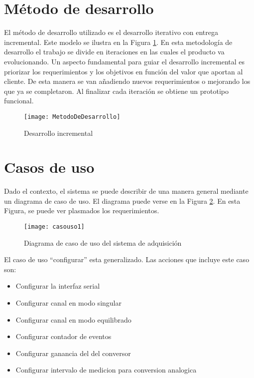 \section{Método de desarrollo} %
\label{sec:metodo_de_desarrollo}

El método de desarrollo utilizado es el desarrollo iterativo con entrega incremental. Este modelo se ilustra en la Figura \ref{fig:MetodoDeDesarrollo}. En esta metodología de desarrollo el trabajo se divide en iteraciones en las cuales el producto va evolucionando. 
Un aspecto fundamental para guiar el desarrollo incremental es priorizar los requerimientos y los objetivos en función del valor que aportan al cliente. De esta manera se van añadiendo nuevos requerimientos o mejorando los que ya se completaron. Al finalizar cada iteración se obtiene un prototipo funcional.

\begin{figure}[h]
  \centering
  \texttt{[image: MetodoDeDesarrollo]}
  \caption{Desarrollo incremental}\label{fig:MetodoDeDesarrollo}
\end{figure}


\section{Casos de uso} %
\label{sec:casos_de_uso}

Dado el contexto, el sistema se puede describir de una manera general mediante un diagrama de caso de uso. El diagrama puede verse en la Figura \ref{fig:casouso1}. En esta Figura, se puede ver plasmados los requerimientos.

\begin{figure}[h]
  \centering
  \texttt{[image: casouso1]}
  \caption{Diagrama de caso de uso del sistema de adquisición}\label{fig:casouso1}
\end{figure}

El caso de uso ``configurar'' esta generalizado. Las acciones que incluye este caso son:
\begin{itemize}
	\item Configurar la interfaz serial
	\item Configurar canal en modo singular
	\item Configurar canal en modo equilibrado
	\item Configurar contador de eventos
	\item Configurar ganancia del del conversor
	\item Configurar intervalo de medicion para conversion analogica
\end{itemize}


